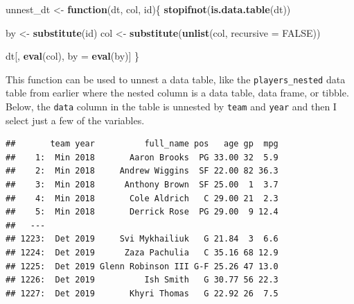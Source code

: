 \documentclass[doc,floatsintext]{apa6}
\newenvironment{Shaded}{\begin{snugshade}}{\end{snugshade}}
\newcommand{\ControlFlowTok}[1]{\textcolor[rgb]{0.13,0.29,0.53}{\textbf{#1}}}
\newcommand{\DataTypeTok}[1]{\textcolor[rgb]{0.13,0.29,0.53}{#1}}
\newcommand{\KeywordTok}[1]{\textcolor[rgb]{0.13,0.29,0.53}{\textbf{#1}}}
\newcommand{\NormalTok}[1]{#1}
\newcommand{\OperatorTok}[1]{\textcolor[rgb]{0.81,0.36,0.00}{\textbf{#1}}}
\newcommand{\OtherTok}[1]{\textcolor[rgb]{0.56,0.35,0.01}{#1}}
\newcommand{\StringTok}[1]{\textcolor[rgb]{0.31,0.60,0.02}{#1}}
\begin{document}
\begin{Shaded}
\begin{Highlighting}[]
\NormalTok{unnest_dt <-}\StringTok{ }\ControlFlowTok{function}\NormalTok{(dt, col, id)\{}
  \KeywordTok{stopifnot}\NormalTok{(}\KeywordTok{is.data.table}\NormalTok{(dt))}
  
\NormalTok{  by <-}\StringTok{ }\KeywordTok{substitute}\NormalTok{(id)}
\NormalTok{  col <-}\StringTok{ }\KeywordTok{substitute}\NormalTok{(}\KeywordTok{unlist}\NormalTok{(col, }\DataTypeTok{recursive =} \OtherTok{FALSE}\NormalTok{))}
  
\NormalTok{  dt[, }\KeywordTok{eval}\NormalTok{(col), by =}\StringTok{ }\KeywordTok{eval}\NormalTok{(by)]}
\NormalTok{\}}
\end{Highlighting}
\end{Shaded}

This function can be used to unnest a data table, like the \texttt{players\_nested} data table from earlier where the nested column is a data table, data frame, or tibble. Below, the \texttt{data} column in the table is unnested by \texttt{team} and \texttt{year} and then I select just a few of the variables.

\begin{Shaded}
\end{Shaded}

\begin{verbatim}
##       team year          full_name pos   age gp  mpg
##    1:  Min 2018       Aaron Brooks  PG 33.00 32  5.9
##    2:  Min 2018     Andrew Wiggins  SF 22.00 82 36.3
##    3:  Min 2018      Anthony Brown  SF 25.00  1  3.7
##    4:  Min 2018       Cole Aldrich   C 29.00 21  2.3
##    5:  Min 2018       Derrick Rose  PG 29.00  9 12.4
##   ---                                               
## 1223:  Det 2019     Svi Mykhailiuk   G 21.84  3  6.6
## 1224:  Det 2019      Zaza Pachulia   C 35.16 68 12.9
## 1225:  Det 2019 Glenn Robinson III G-F 25.26 47 13.0
## 1226:  Det 2019          Ish Smith   G 30.77 56 22.3
## 1227:  Det 2019       Khyri Thomas   G 22.92 26  7.5
\end{verbatim}
\end{document}

